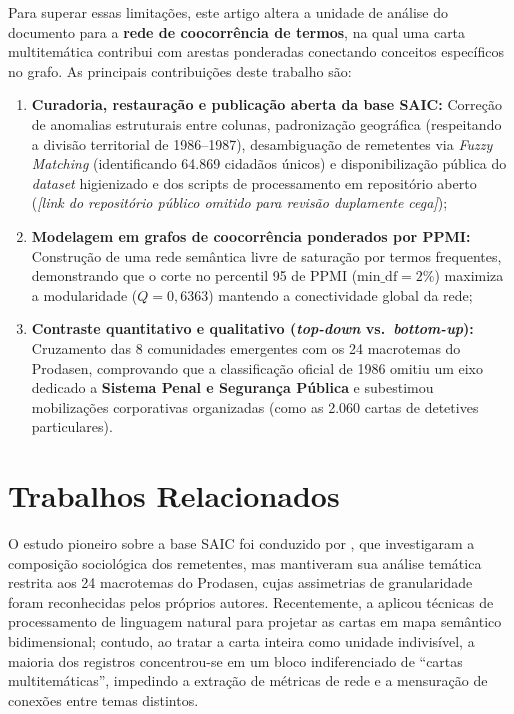 \documentclass[12pt]{article}
\newcommand{\repolink}{\textit{[link do repositório público omitido para revisão duplamente cega]}}
\begin{document}
Para superar essas limitações, este artigo altera a unidade de análise do documento para a \textbf{rede de coocorrência de termos}, na qual uma carta multitemática contribui com arestas ponderadas conectando conceitos específicos no grafo. As principais contribuições deste trabalho são:
\begin{enumerate}
    \item \textbf{Curadoria, restauração e publicação aberta da base SAIC:} Correção de anomalias estruturais entre colunas, padronização geográfica (respeitando a divisão territorial de 1986--1987), desambiguação de remetentes via \textit{Fuzzy Matching} (identificando 64.869 cidadãos únicos) e disponibilização pública do \textit{dataset} higienizado e dos scripts de processamento em repositório aberto (\repolink);
    \item \textbf{Modelagem em grafos de coocorrência ponderados por PPMI:} Construção de uma rede semântica livre de saturação por termos frequentes, demonstrando que o corte no percentil 95 de PPMI ($\text{min\_df} = 2\%$) maximiza a modularidade ($Q = 0,6363$) mantendo a conectividade global da rede;
    \item \textbf{Contraste quantitativo e qualitativo (\textit{top-down} vs.\ \textit{bottom-up}):} Cruzamento das 8 comunidades emergentes com os 24 macrotemas do Prodasen, comprovando que a classificação oficial de 1986 omitiu um eixo dedicado a \textbf{Sistema Penal e Segurança Pública} e subestimou mobilizações corporativas organizadas (como as 2.060 cartas de detetives particulares).
\end{enumerate}

\section{Trabalhos Relacionados}

O estudo pioneiro sobre a base SAIC foi conduzido por \cite{monclaire1991}, que investigaram a composição sociológica dos remetentes, mas mantiveram sua análise temática restrita aos 24 macrotemas do Prodasen, cujas assimetrias de granularidade foram reconhecidas pelos próprios autores. Recentemente, a \cite{agenciasenado2024} aplicou técnicas de processamento de linguagem natural para projetar as cartas em mapa semântico bidimensional; contudo, ao tratar a carta inteira como unidade indivisível, a maioria dos registros concentrou-se em um bloco indiferenciado de ``cartas multitemáticas'', impedindo a extração de métricas de rede e a mensuração de conexões entre temas distintos.
\end{document}
